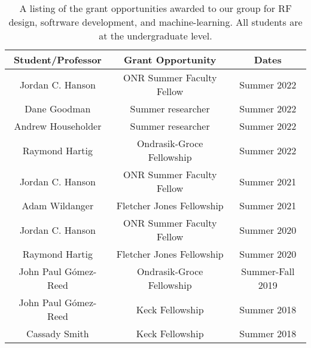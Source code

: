 \documentclass[../../main.tex]{subfiles}
\begin{document}
\begin{table}
\centering
\begin{tabular}{c c c}
Student/Professor & Grant Opportunity & Dates \\ \hline
Jordan C. Hanson & ONR Summer Faculty Fellow & Summer 2022 \\
Dane Goodman & Summer researcher & Summer 2022 \\
Andrew Householder & Summer researcher & Summer 2022 \\
Raymond Hartig & Ondrasik-Groce Fellowship & Summer 2022 \\
Jordan C. Hanson & ONR Summer Faculty Fellow & Summer 2021 \\
Adam Wildanger & Fletcher Jones Fellowship & Summer 2021 \\
Jordan C. Hanson & ONR Summer Faculty Fellow & Summer 2020 \\
Raymond Hartig & Fletcher Jones Fellowship & Summer 2020 \\
John Paul G\'{o}mez-Reed & Ondrasik-Groce Fellowship & Summer-Fall 2019 \\
John Paul G\'{o}mez-Reed & Keck Fellowship & Summer 2018 \\
Cassady Smith & Keck Fellowship & Summer 2018
\end{tabular}
\caption{\label{tab:funds} A listing of the grant opportunities awarded to our group for RF design, softrware development, and machine-learning.  All students are at the undergraduate level.}
\end{table}
\end{document}
